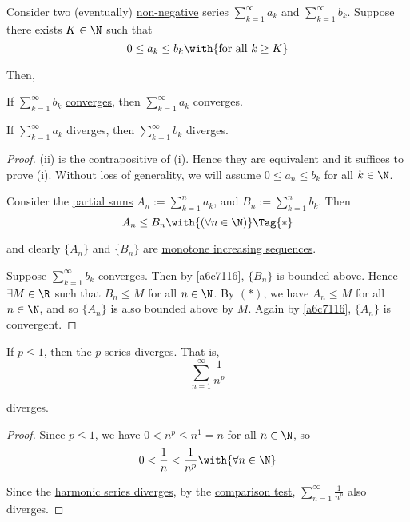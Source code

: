 \label{d0856d6}

Consider two (eventually) \href{b6cffeb}{non-negative} series
$\sum_{k=1}^\infty a_k$ and $\sum_{k=1}^\infty b_k$. Suppose there exists
$K\in\N$ such that
$$
  0\leq a_k\leq b_k\with{\text{for all } k\geq K}
$$

Then,
\begin{enumerati}
  \item If $\sum_{k=1}^\infty b_k$ \href{f8901df}{converges}, then
        $\sum_{k=1}^\infty a_k$ converges.
  \item If $\sum_{k=1}^\infty a_k$ diverges, then $\sum_{k=1}^\infty b_k$
        diverges.
\end{enumerati}

\begin{proof}
  (ii) is the contrapositive of (i). Hence they are equivalent and it suffices
  to prove (i). Without loss of generality, we will assume $0\leq a_n\leq b_k$
  for all $k\in\N$.

  Consider the \href{a835138}{partial sums} $A_n:=\sum_{k=1}^na_k$, and
  $B_n:=\sum_{k=1}^nb_k$. Then
  \begin{equation*}
    A_n\leq B_n\with{(\forall n\in\N)}\Tag{*}
  \end{equation*}

  and clearly $\{A_n\}$ and $\{B_n\}$ are \href{feae1b2}{monotone increasing
  sequences}.

  Suppose $\sum_{k=1}^\infty b_k$ converges. Then by \autoref{a6c7116},
  $\{B_n\}$ is \href{d5ed299}{bounded above}. Hence $\exists M\in\R$ such that
  $B_n\leq M$ for all $n\in\N$. By $(*)$, we have $A_n\leq M$ for all $n\in\N$,
  and so $\{A_n\}$ is also bounded above by $M$. Again by \autoref{a6c7116},
  $\{A_n\}$ is convergent.
\end{proof}

\label{efd3d2d}

If $p\leq1$, then the \href{cccc2e8}{$p$-series} diverges. That is,
$$
  \sum_{n=1}^\infty\frac1{n^p}
$$

diverges.

\begin{proof}
  Since $p\leq1$, we have $0<n^p\leq n^1=n$ for all $n\in\N$, so
  $$
    0<\frac1n<\frac1{n^p}\with{\forall n\in\N}
  $$

  Since the \href{ffaeb85}{harmonic series diverges}, by the
  \href{d0856d6}{comparison test}, $\displaystyle\sum_{n=1}^\infty\frac1{n^p}$
  also diverges.
\end{proof}

